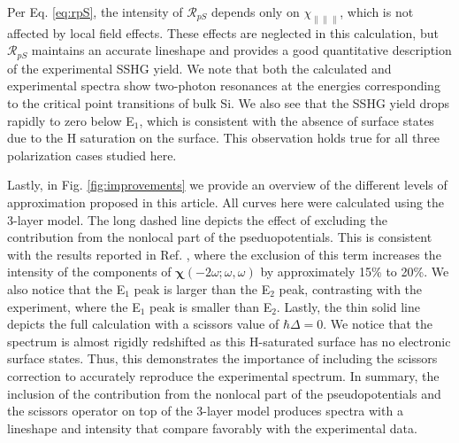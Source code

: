 \documentclass[11pt]{book}
\begin{document}
Per Eq. \eqref{eq:rpS}, the intensity of $\mathcal{R}_{pS}$ depends only on $\chi_{\parallel\parallel\parallel}$, which is not affected by local field effects.\cite{tancognedejean:tel-01235611} These effects are neglected in this calculation, but $\mathcal{R}_{pS}$ maintains an accurate lineshape and provides a good quantitative description of the experimental SSHG yield. We note that both the calculated and experimental spectra show two-photon resonances at the energies corresponding to the critical point transitions of bulk Si. We also see that the SSHG yield drops rapidly to zero below E$_{1}$, which is consistent with the absence of surface states due to the H saturation on the surface. This observation holds true for all three polarization cases studied here.

Lastly, in Fig. \ref{fig:improvements} we provide an overview of the different levels of approximation proposed in this article. All curves here were calculated using the 3-layer model. The long dashed line depicts the effect of excluding the contribution from the nonlocal part of the pseduopotentials. This is consistent with the results reported in Ref. \cite{andersonPRB15}, where the exclusion of this term increases the intensity of the components of $\boldsymbol{\chi}(-2\omega;\omega,\omega)$ by approximately 15\% to 20\%. We also notice that the E$_{1}$ peak is larger than the E$_{2}$ peak, contrasting with the experiment, where the E$_{1}$ peak is smaller than E$_{2}$. Lastly, the thin solid line depicts the full calculation with a scissors value of $\hbar\Delta = 0$. We notice that the spectrum is almost rigidly redshifted as this H-saturated surface has no electronic surface states.\cite{andersonPRB15} Thus, this demonstrates the importance of including the scissors correction to accurately reproduce the experimental spectrum. In summary, the inclusion of the contribution from the nonlocal part of the pseudopotentials and the scissors operator on top of the 3-layer model produces spectra with a lineshape and intensity that compare favorably with the experimental data.
\end{document}
